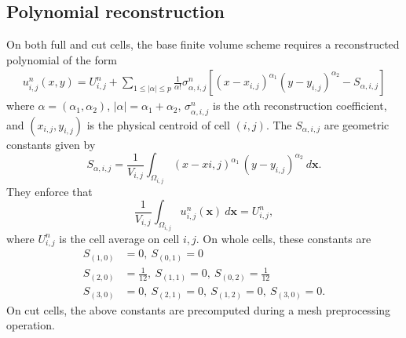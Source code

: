 \subsection{Polynomial reconstruction} \label{sec:ho_reconstruction}
On both full and cut cells, the base finite volume scheme requires a reconstructed polynomial of the form
\begin{equation}\label{eq:uu}
\begin{aligned}
u^n_{i,j} (x,y) = U^n_{i,j} +  \sum_{1 \leq |\alpha| \leq p}  \frac{1}{\alpha!} \sigma^n_{\alpha,i,j} [(x- x_{i,j})^{\alpha_1}(y-y_{i,j})^{\alpha_2}- S_{\alpha,i,j}]
\end{aligned}
\end{equation}
where $\alpha = (\alpha_1, \alpha_2)$, $|\alpha| = \alpha_1 + \alpha_2$, $\sigma^n_{\alpha,i,j}$ is the $\alpha$th reconstruction coefficient, and $ (x_{i,j}, y_{i,j})$ is the physical centroid of cell $(i,j)$. 
The $  S_{\alpha, i,j}$ are geometric constants given by
$$
S_{\alpha, i,j} = \frac{1}{ V_{i,j}}  \int_{\Omega_{i,j}} 
(x-x{i,j})^{\alpha_1} \, (y-y_{i,j})^{\alpha_2} ~ d\mathbf{x} .
$$
They enforce that 
\begin{equation} \label{eq:uaverage}
\frac{1}{ V_{i,j}}  \int_{\Omega_{i,j}} u^n_{i,j}(\mathbf{x}) ~d\mathbf{x} = U^n_{i,j},
\end{equation}
where  $U^n_{i,j}$ is the cell average on cell $i,j$.  On whole cells, 
these constants are
\begin{equation}
	\begin{aligned}
		S_{(1,0)} &= 0, ~ S_{(0,1)} = 0 \\
		S_{(2,0)} &= \frac{1}{12}, ~ S_{(1,1)} = 0, ~ S_{(0,2)} = \frac{1}{12}\\
		S_{(3,0)} &= 0, ~ S_{(2,1)} = 0, ~ S_{(1,2)} = 0, ~ S_{(3,0)} = 0.
	\end{aligned}
\end{equation}
On cut cells, the above constants are precomputed during a mesh preprocessing operation.


